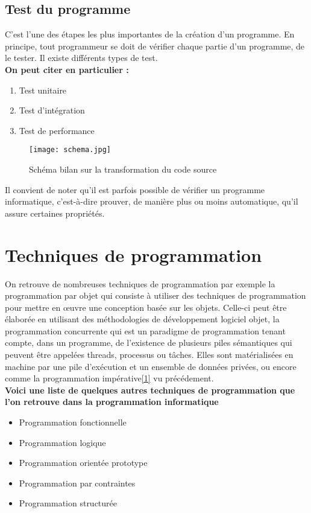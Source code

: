 \documentclass[12pt,a4paper]{article}
\begin{document}
\subsection{Test du programme}
C'est l'une des étapes les plus importantes de la création d'un 
programme. En principe, tout programmeur se doit de vérifier chaque 
partie d'un programme, de le tester. Il existe différents types de 
test. \\
\textbf{On peut citer en particulier :}
\begin{enumerate}
 \item Test unitaire
 \item Test d'intégration
 \item Test de performance
\end{enumerate}
\begin{figure}[ht]
 \centering
  \texttt{[image: schema.jpg]}
  \caption{Schéma bilan sur la transformation du code source}
  \label{Schéma bilan sur la transformation du code source}
\end{figure}
\newpage
Il convient de noter qu'il est parfois possible de vérifier un programme 
informatique, c'est-à-dire prouver, de manière plus ou moins automatique, qu'il 
assure certaines propriétés.\\
\section{Techniques de programmation}
On retrouve de nombreuses techniques de programmation par exemple la 
programmation par objet qui consiste à utiliser des techniques de programmation 
pour mettre en œuvre une conception basée sur les objets. Celle-ci peut être 
élaborée en utilisant des méthodologies de développement logiciel objet, la 
programmation  concurrente qui est un paradigme de programmation tenant compte, 
dans un  programme, de l'existence de plusieurs piles sémantiques qui peuvent 
être appelées threads, processus ou tâches. Elles sont matérialisées en machine 
par une pile d'exécution et un ensemble de données privées, ou encore comme la 
programmation impérative\ref{1} vu précédement.\\
\textbf{Voici une liste de quelques autres techniques de programmation que l'on 
retrouve dans la programmation informatique}
\begin{itemize}[leftmargin=50px]
  \item Programmation fonctionnelle
  \item Programmation logique
  \item Programmation orientée prototype
  \item Programmation par contraintes \cite{the}
  \item Programmation structurée
  \label{3}
\end{itemize}
\newpage  


\end{document}
